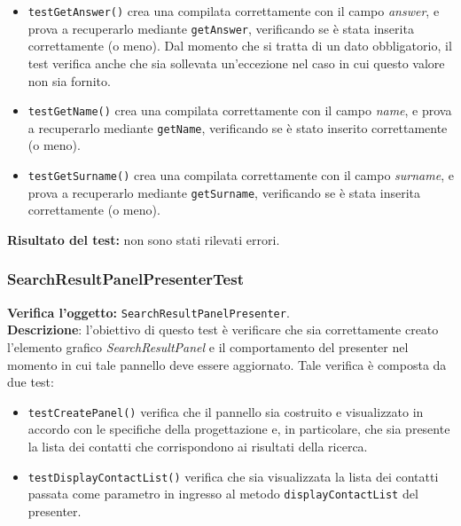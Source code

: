 \begin{itemize}
\item \texttt{testGetAnswer()} crea una  compilata correttamente con il campo \textit{answer}, e prova a recuperarlo mediante \texttt{getAnswer}, verificando se è stata inserita correttamente (o meno). Dal momento che si tratta di un dato obbligatorio, il test verifica anche che sia sollevata un'eccezione nel caso in cui questo valore non sia fornito.
\item \texttt{testGetName()}  crea una  compilata correttamente con il campo \textit{name}, e prova a recuperarlo mediante \texttt{getName}, verificando se è stato inserito correttamente (o meno).
\item \texttt{testGetSurname()}  crea una  compilata correttamente con il campo \textit{surname}, e prova a recuperarlo mediante \texttt{getSurname}, verificando se è stata inserita correttamente (o meno).

\end{itemize}
\textbf{Risultato del test:} non sono stati rilevati errori.

\subsubsection{SearchResultPanelPresenterTest}
\textbf{Verifica l'oggetto:} \texttt{SearchResultPanelPresenter}.\\
\textbf{Descrizione}: l'obiettivo di questo test è verificare che sia correttamente creato l'elemento grafico \textit{SearchResultPanel} e il comportamento del presenter nel momento in cui tale pannello deve essere aggiornato. Tale verifica è composta da due test:
\begin{itemize}
\item \texttt{testCreatePanel()} verifica che il pannello sia costruito e visualizzato in accordo con le specifiche della progettazione e, in particolare, che sia presente la lista dei contatti che corrispondono ai risultati della ricerca.
\item \texttt{testDisplayContactList()} verifica che sia visualizzata la lista dei contatti passata come parametro in ingresso al metodo \texttt{displayContactList} del presenter.
\end{itemize}

